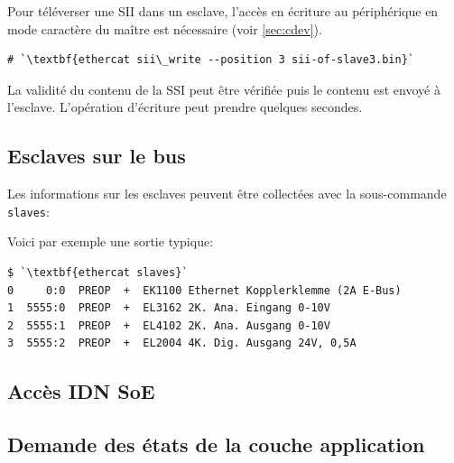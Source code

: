 \documentclass[a4paper,12pt,BCOR=6mm,bibtotoc,idxtotoc]{scrbook}
\begin{document}
Pour t\'el\'everser une SII dans un esclave, l'acc\`es en \'ecriture
au p\'eriph\'erique en mode caract\`ere du ma\^itre est n\'ecessaire
(voir \autoref{sec:cdev}).



\begin{lstlisting}
# `\textbf{ethercat sii\_write --position 3 sii-of-slave3.bin}`
\end{lstlisting}

La validit\'e du contenu de la SSI peut \^etre v\'erifi\'ee puis le
contenu est envoy\'e \`a l'esclave.  L'op\'eration d'\'ecriture peut
prendre quelques secondes.


\subsection{Esclaves sur le bus}

Les informations sur les esclaves peuvent \^etre collect\'ees avec la
sous-commande \lstinline+slaves+:



Voici par exemple une sortie typique:

\begin{lstlisting}
$ `\textbf{ethercat slaves}`
0     0:0  PREOP  +  EK1100 Ethernet Kopplerklemme (2A E-Bus)
1  5555:0  PREOP  +  EL3162 2K. Ana. Eingang 0-10V
2  5555:1  PREOP  +  EL4102 2K. Ana. Ausgang 0-10V
3  5555:2  PREOP  +  EL2004 4K. Dig. Ausgang 24V, 0,5A
\end{lstlisting}


\subsection{Acc\`es IDN SoE}
\label{sec:soeaccess}






\subsection{Demande des \'etats de la couche application}
\end{document}
